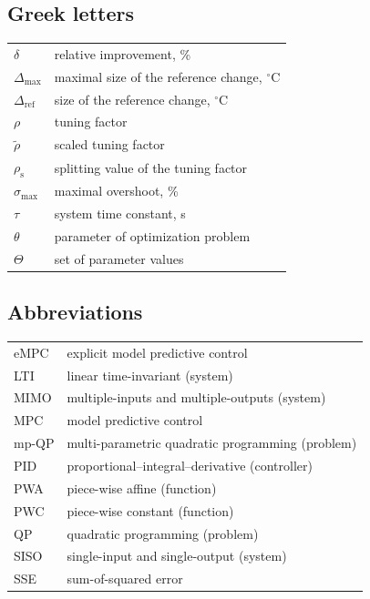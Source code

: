 \documentclass[preprint,12pt]{elsarticle}
\begin{document}
	\subsection{Greek letters}
		\begin{tabular}{ l l }
			$\delta$ & relative improvement, \% \\
			$\Delta_\mathrm{max}$ & maximal size of the reference change, $^{\circ}\mathrm{C}$  \\
			$\Delta_\mathrm{ref}$ & size of the reference change, $^{\circ}\mathrm{C}$ \\
			$\rho$ & tuning factor \\
			$\widetilde{\rho}$ & scaled tuning factor \\
			$\rho_{\mathrm{s}}$ & splitting value of the tuning factor \\
			$\sigma_{\max}$ & maximal overshoot, \% \\
			$\tau$ & system time constant, s\\
			$\theta$ & parameter of optimization problem \\
			$\Theta$ & set of parameter values
		\end{tabular}
	
	\subsection*{Abbreviations}
		\begin{tabular}{ l l }
			eMPC & explicit model predictive control \\			
			LTI  & linear time-invariant (system) \\
			MIMO & multiple-inputs and multiple-outputs (system) \\
			MPC  & model predictive control \\
			mp-QP& multi-parametric quadratic programming (problem) \\
			PID  & proportional–integral–derivative (controller) \\
			PWA  & piece-wise affine (function) \\
			PWC  & piece-wise constant (function) \\
			QP   & quadratic programming (problem) \\
			SISO & single-input and single-output (system) \\
			SSE  & sum-of-squared error 
		\end{tabular}
	
\end{document}
